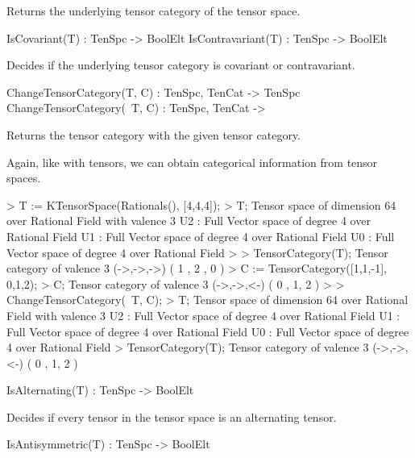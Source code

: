 Returns the underlying tensor category of the tensor space.

\begin{intrinsics}
IsCovariant(T) : TenSpc -> BoolElt
IsContravariant(T) : TenSpc -> BoolElt
\end{intrinsics}

Decides if the underlying tensor category is covariant or contravariant.

\begin{intrinsics}
ChangeTensorCategory(T, C) : TenSpc, TenCat -> TenSpc
ChangeTensorCategory(~T, C) : TenSpc, TenCat -> 
\end{intrinsics}

Returns the tensor category with the given tensor category.

\begin{example}[TenSpcCategories]

Again, like with tensors, we can obtain categorical information from tensor spaces.
\begin{code}
> T := KTensorSpace(Rationals(), [4,4,4]);
> T;
Tensor space of dimension 64 over Rational Field with valence 3
U2 : Full Vector space of degree 4 over Rational Field
U1 : Full Vector space of degree 4 over Rational Field
U0 : Full Vector space of degree 4 over Rational Field
> 
> TensorCategory(T);
Tensor category of valence 3 (->,->,->) ({ 1 },{ 2 },{ 0 })
> C := TensorCategory([1,1,-1], {{0},{1,2}});
> C;
Tensor category of valence 3 (->,->,<-) ({ 0 },{ 1, 2 })
> 
> ChangeTensorCategory(~T, C);
> T;
Tensor space of dimension 64 over Rational Field with valence 3
U2 : Full Vector space of degree 4 over Rational Field
U1 : Full Vector space of degree 4 over Rational Field
U0 : Full Vector space of degree 4 over Rational Field
> TensorCategory(T);
Tensor category of valence 3 (->,->,<-) ({ 0 },{ 1, 2 })
\end{code}
\end{example}


\begin{intrinsics}
IsAlternating(T) : TenSpc -> BoolElt
\end{intrinsics}

Decides if every tensor in the tensor space is an alternating tensor.

\begin{intrinsics}
IsAntisymmetric(T) : TenSpc -> BoolElt
\end{intrinsics}

